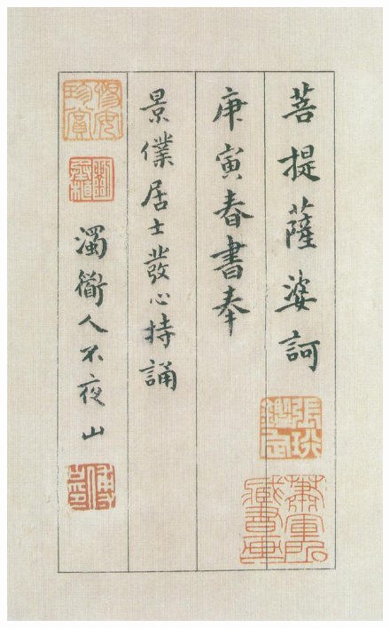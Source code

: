 \documentclass[a4paper,twoside]{article}
\begin{document}
\begin{figure}[ht]
\centering
\includegraphics[width=13.8cm]{images/fushan-8}
\end{figure}
\end{document}
